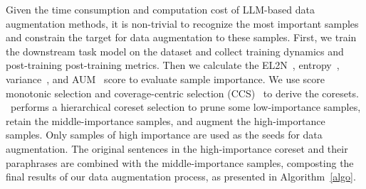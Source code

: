 Given the time consumption and computation cost of LLM-based data augmentation methods, it is non-trivial to recognize the most important samples and constrain the target for data augmentation to these samples. 
First, we train the downstream task model on the dataset and collect training dynamics and post-training post-training metrics. 
Then we calculate the EL2N~\cite{paul2021deep}, entropy~\cite{coleman2019selection}, variance~\cite{swayamdipta2020dataset}, and AUM~\cite{pleiss2020identifying} score to evaluate sample importance. 
We use score monotonic selection and coverage-centric selection (CCS)~\cite{zheng2022coverage} to derive the coresets.
\Methodnamea~performs a hierarchical coreset selection to prune some low-importance samples, retain the middle-importance samples, and augment the high-importance samples. 
Only samples of high importance are used as the seeds for data augmentation. 
The original sentences in the high-importance coreset and their paraphrases are combined with the middle-importance samples, composting the final results of our data augmentation process, as presented in Algorithm~\ref{algo}.
